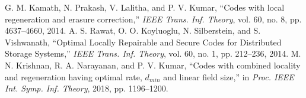 \begin{multicols}{2}
\begin{thebibliography}{99}
 G. M. Kamath, N. Prakash, V. Lalitha, and P. V. Kumar, ``Codes with local regeneration and erasure correction,'' \textit{IEEE Trans. Inf. Theory}, vol. 60, no. 8, pp. 4637--4660, 2014.
 A. S. Rawat, O. O. Koyluoglu, N. Silberstein, and S. Vishwanath, ``Optimal Locally Repairable and Secure Codes for Distributed Storage Systems,'' \textit{IEEE Trans. Inf. Theory}, vol. 60, no. 1, pp. 212--236, 2014.
 M. N. Krishnan, R. A. Narayanan, and P. V. Kumar, ``Codes with combined locality and regeneration having optimal rate, $d_{min}$ and linear field size,'' in \textit{Proc. IEEE Int. Symp. Inf. Theory}, 2018, pp. 1196--1200.
\end{thebibliography}
\end{multicols}






 
